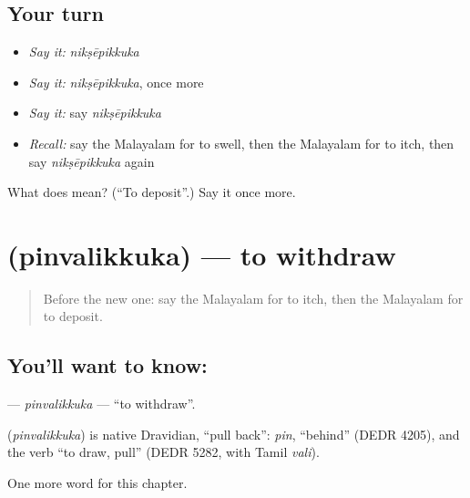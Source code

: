 \subsection*{Your turn}
\begin{itemize}
\raggedright
  \item \emph{Say it:} \emph{nikṣēpikkuka}
  \item \emph{Say it:} \emph{nikṣēpikkuka}, once more
  \item \emph{Say it:} say \emph{nikṣēpikkuka}
  \item \emph{Recall:} say the Malayalam for to swell, then the Malayalam for to itch, then say \emph{nikṣēpikkuka} again
\end{itemize}

\begin{tcolorbox}[breakable,colback=teal!4,colframe=teal!35!black,title={Before you move on}]
What does  mean? (\textquotedblleft{}To deposit\textquotedblright{}.) Say it once more.
\end{tcolorbox}
\section[\texorpdfstring{\ml{പിൻവലിക്കുക} (pinvalikkuka)}{പിൻവലിക്കുക (pinvalikkuka)}]{ (pinvalikkuka) — to withdraw}

\label{lesson:ML-C305-pinvalikkuka}



\begin{quote}
Before the new one: say the Malayalam for to itch, then the Malayalam for to deposit.
\end{quote}

\subsection*{You'll want to know: }
\textbf{} — \emph{pinvalikkuka} — \textquotedblleft{}to withdraw\textquotedblright{}.

\begin{cousinweb}
\textbf{} (\emph{pinvalikkuka}) is native Dravidian, \textquotedblleft{}pull back\textquotedblright{}: \emph{pin}, \textquotedblleft{}behind\textquotedblright{} (DEDR 4205), and the verb \textquotedblleft{}to draw, pull\textquotedblright{} (DEDR 5282, with Tamil \emph{vali}).
\end{cousinweb}

\begin{grammarlens}[title={What you've built}]
One more word for this chapter.
\end{grammarlens}

